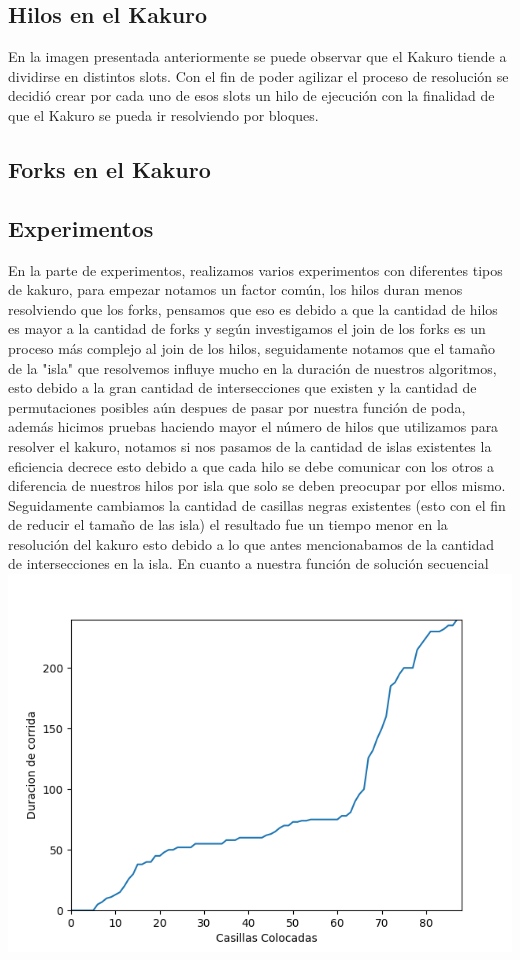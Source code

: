 \documentclass[conference]{IEEEtran}
\begin{document}
\subsection{Hilos en el Kakuro}

En la imagen presentada anteriormente se puede observar que el Kakuro tiende a dividirse en distintos slots. Con el fin de poder agilizar el proceso de resolución se decidió crear por cada uno de esos slots un hilo de ejecución con la finalidad de que el Kakuro se pueda ir resolviendo por bloques.

\subsection{Forks en el Kakuro}



\subsection{Experimentos}
En la parte de experimentos, realizamos varios experimentos con diferentes tipos de kakuro, para empezar notamos un factor común, los hilos duran menos resolviendo que los forks, pensamos que eso es debido a que la cantidad de hilos es mayor a la cantidad de forks y según investigamos el join de los forks es un proceso más complejo al join de los hilos, seguidamente notamos que el tamaño de la "isla" que resolvemos influye mucho en la duración de nuestros algoritmos, esto debido a la gran cantidad de intersecciones que existen y la cantidad de permutaciones posibles aún despues de pasar por nuestra función de poda, además hicimos pruebas haciendo mayor el número de hilos que utilizamos para resolver el kakuro, notamos si nos pasamos de la cantidad de islas existentes la eficiencia decrece esto debido a que cada hilo se debe comunicar con los otros a diferencia de nuestros hilos por isla que solo se deben preocupar por ellos mismo. Seguidamente cambiamos la cantidad de casillas negras existentes (esto con el fin de reducir el tamaño de las isla) el resultado fue un tiempo menor en la resolución del kakuro esto debido a lo que antes mencionabamos de la cantidad de intersecciones en la isla. En cuanto a nuestra función de solución secuencial\newline
\centering	\includegraphics[width=\linewidth]{Grafico Forks.png}\newline
\end{document}
